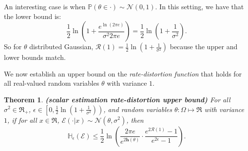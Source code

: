 \documentclass[twoside,11pt]{article}
\newtheorem{theorem}{Theorem}
\def\environment{\mathcal{E}}
\def\regret{\mathcal{R}}
\def\diffentropy{\bf h}
\def\H{\mathbb{H}}
\def\diffentropy{\mathbf{h}}
\def\Pr{\mathbb{P}}
\begin{document}
An interesting case is when $\Pr(\theta\in\cdot)\sim\mathcal{N}(0, 1)$. In this setting, we have that the lower bound is:
$$\frac{1}{2}\ln\left(1 + \frac{e^{\ln(2\pi e)}}{\sigma^2 2\pi e}\right) = \frac{1}{2}\ln\left(1 + \frac{1}{\sigma^2}\right).$$
So for $\theta$ distributed Gaussian, $\regret(1) = \frac{1}{2}\ln\left(1 + \frac{1}{\sigma^2}\right)$ because the upper and lower bounds match. 

We now establish an upper bound on the \emph{rate-distortion function} that holds for all real-valued random variables $\theta$ with variance $1$.
\begin{theorem}{\bf(scalar estimation rate-distortion upper bound)}
    \label{th:scalar-estimation-general-upper-bound}
    For all $\sigma^2 \in \Re_{+}$, $\epsilon \in \left[0, \frac{1}{2}\ln\left(1 + \frac{1}{\sigma^2}\right)\right)$, and random variables $\theta:\Omega\mapsto\Re$ with variance $1$, if for all $x\in \Re$, $\environment(\cdot|x)\sim \mathcal{N}(\theta, \sigma^2)$, then
    $$\H_\epsilon(\environment) \leq \frac{1}{2}\ln\left(\frac{2\pi e}{e^{2\diffentropy(\theta)}} \cdot \frac{e^{2\regret(1)}-1}{e^{2\epsilon}-1}\right).$$
\end{theorem}
\end{document}
